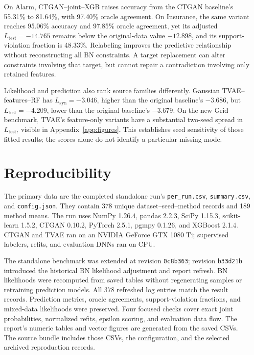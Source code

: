 \documentclass[11pt,letterpaper]{article}
\newcommand{\Lsyn}{L_{\mathrm{syn}}}
\newcommand{\Ltest}{L_{\mathrm{test}}}
\begin{document}
On Alarm, CTGAN--joint--XGB raises accuracy from the CTGAN baseline's 55.31\% to 81.64\%, with 97.40\% oracle agreement. On Insurance, the same variant reaches 95.06\% accuracy and 97.85\% oracle agreement, yet its adjusted $\Ltest=-14.765$ remains below the original-data value $-12.898$, and its support-violation fraction is 48.33\%. Relabeling improves the predictive relationship without reconstructing all BN constraints. A target replacement can alter constraints involving that target, but cannot repair a contradiction involving only retained features.

Likelihood and prediction also rank source families differently. Gaussian TVAE--features--RF has $\Lsyn=-3.046$, higher than the original baseline's $-3.686$, but $\Ltest=-4.209$, lower than the original baseline's $-3.679$. On the new Grid benchmark, TVAE's feature-only variants have a substantial two-seed spread in $\Ltest$, visible in Appendix~\ref{app:figures}. This establishes seed sensitivity of those fitted results; the scores alone do not identify a particular missing mode.

\section{Reproducibility}
The primary data are the completed standalone run's \texttt{per\_run.csv}, \texttt{summary.csv}, and \texttt{config.json}. They contain 378 unique dataset--seed--method records and 189 method means. The run uses NumPy 1.26.4, pandas 2.2.3, SciPy 1.15.3, scikit-learn 1.5.2, CTGAN 0.10.2, PyTorch 2.5.1, pgmpy 0.1.26, and XGBoost 2.1.4. CTGAN and TVAE ran on an NVIDIA GeForce GTX 1080 Ti; supervised labelers, refits, and evaluation DNNs ran on CPU.

The standalone benchmark was extended at revision \texttt{0c8b363}; revision \texttt{b33d21b} introduced the historical BN likelihood adjustment and report refresh. BN likelihoods were recomputed from saved tables without regenerating samples or retraining prediction models. All 378 refreshed log entries match the result records. Prediction metrics, oracle agreements, support-violation fractions, and mixed-data likelihoods were preserved. Four focused checks cover exact joint probabilities, normalized refits, epsilon scoring, and evaluation data flow. The report's numeric tables and vector figures are generated from the saved CSVs. The source bundle includes those CSVs, the configuration, and the selected archived reproduction records.
\end{document}
